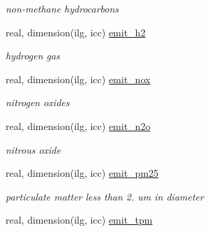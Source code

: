 \begin{DoxyCompactItemize}
\begin{DoxyCompactList}\small\item\em non-\/methane hydrocarbons \end{DoxyCompactList}\item 
\hypertarget{structctem__statevars_1_1veg__gat_a39fc2e49109396348286998f87528eff}{}real, dimension(ilg, icc) \hyperlink{structctem__statevars_1_1veg__gat_a39fc2e49109396348286998f87528eff}{emit\+\_\+h2}\label{structctem__statevars_1_1veg__gat_a39fc2e49109396348286998f87528eff}

\begin{DoxyCompactList}\small\item\em hydrogen gas \end{DoxyCompactList}\item 
\hypertarget{structctem__statevars_1_1veg__gat_a26f5d7c30ce650905385fbe031f348ca}{}real, dimension(ilg, icc) \hyperlink{structctem__statevars_1_1veg__gat_a26f5d7c30ce650905385fbe031f348ca}{emit\+\_\+nox}\label{structctem__statevars_1_1veg__gat_a26f5d7c30ce650905385fbe031f348ca}

\begin{DoxyCompactList}\small\item\em nitrogen oxides \end{DoxyCompactList}\item 
\hypertarget{structctem__statevars_1_1veg__gat_a30e2aff024732ce535c46d268a109ea5}{}real, dimension(ilg, icc) \hyperlink{structctem__statevars_1_1veg__gat_a30e2aff024732ce535c46d268a109ea5}{emit\+\_\+n2o}\label{structctem__statevars_1_1veg__gat_a30e2aff024732ce535c46d268a109ea5}

\begin{DoxyCompactList}\small\item\em nitrous oxide \end{DoxyCompactList}\item 
\hypertarget{structctem__statevars_1_1veg__gat_a1c0b57039924d92ef038a4afc3f3013f}{}real, dimension(ilg, icc) \hyperlink{structctem__statevars_1_1veg__gat_a1c0b57039924d92ef038a4afc3f3013f}{emit\+\_\+pm25}\label{structctem__statevars_1_1veg__gat_a1c0b57039924d92ef038a4afc3f3013f}

\begin{DoxyCompactList}\small\item\em particulate matter less than 2. um in diameter \end{DoxyCompactList}\item 
\hypertarget{structctem__statevars_1_1veg__gat_ad651a67bdcb7155f4a48209905d1e25e}{}real, dimension(ilg, icc) \hyperlink{structctem__statevars_1_1veg__gat_ad651a67bdcb7155f4a48209905d1e25e}{emit\+\_\+tpm}\label{structctem__statevars_1_1veg__gat_ad651a67bdcb7155f4a48209905d1e25e}


\end{DoxyCompactItemize}

